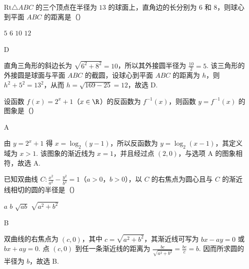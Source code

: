 \begin{problem}
\(\mathrm{Rt}\triangle ABC\) 的三个顶点在半径为 \(13\) 的球面上，直角边的长分别为 \(6\) 和 \(8\)，则球心到平面 \(ABC\) 的距离是（\quad）

\choices
    {\(5\)}
    {\(6\)}
    {\(10\)}
    {\(12\)}
\end{problem}

\begin{answer}
D
\end{answer}

\begin{solution}
直角三角形的斜边长为 \(\sqrt{6^2+8^2}=10\)，所以其外接圆半径为 \(\frac{10}{2}=5\). 该三角形的外接圆是球面与平面 \(ABC\) 的截圆，设球心到平面 \(ABC\) 的距离为 \(h\)，则
\(h^2+5^2=13^2\)，从而 \(h=\sqrt{169-25}=12\)，故选 D.
\end{solution}

\begin{problem}
设函数 \(f(x) = 2^x + 1\)（\(x \in \R\)）的反函数为 \(f^{-1}(x)\)，则函数 \(y = f^{-1}(x)\) 的图象是（\quad）

    {}
    {}
    {}
\end{problem}

\begin{answer}
A
\end{answer}

\begin{solution}
由 \(y=2^x+1\) 得 \(x=\log_2(y-1)\)，所以反函数为 \(y=\log_2(x-1)\)，其定义域为 \(x>1\). 该图象的渐近线为 \(x=1\)，并且经过点 \((2,0)\)，与选项 A 的图象相符，故选 A.
\end{solution}

\begin{problem}
已知双曲线 \(C: \frac{x^2}{a^2} - \frac{y^2}{b^2} = 1\)（\(a > 0\)，\(b > 0\)），以 \(C\) 的右焦点为圆心且与 \(C\) 的渐近线相切的圆的半径是（\quad）

\choices
    {\(a\)}
    {\(b\)}
    {\(\sqrt{ab}\)}
    {\(\sqrt{a^2 + b^2}\)}
\end{problem}

\begin{answer}
B
\end{answer}

\begin{solution}
双曲线的右焦点为 \((c,0)\)，其中 \(c=\sqrt{a^2+b^2}\)，其渐近线可写为 \(bx-ay=0\) 或 \(bx+ay=0\). 点 \((c,0)\) 到任一条渐近线的距离为
\(\frac{bc}{\sqrt{a^2+b^2}}=\frac{bc}{c}=b\). 因而所求圆的半径为 \(b\)，故选 B.
\end{solution}

